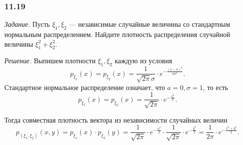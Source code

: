 \subsubsection*{11.19}

\textit{Задание.} Пусть $ \xi_1, \xi_2$ --- независимые случайные величины со стандартным нормальным распределением.
Найдите плотность распределения случайной величины $ \xi_1^2 + \xi_2^2$.

\textit{Решение.} Выпишем плотности $ \xi_1, \xi_2$ каждую из условия
$$p_{ \xi_1} \left( x \right) =
p_{ \xi_2} \left( x \right) =
\frac{1}{ \sqrt{2 \pi} \sigma} \cdot e^{- \frac{ \left( x - a \right)^2}{2 \sigma^2}}.$$
Стандартное нормальное распределение означает, что $a = 0, \sigma = 1$, то есть
$$p_{ \xi_1} \left( x \right) =
p_{ \xi_2} \left( x \right) =
\frac{1}{ \sqrt{2 \pi}} \cdot e^{- \frac{x^2}{2}}.$$

Тогда совместная плотность вектора из независимости случайных величин
$$p_{ \left( \xi_1, \xi_2 \right) } \left( x, y \right) =
p_{ \xi_1} \left( x \right) \cdot p_{ \xi_2} \left( y \right) =
\frac{1}{ \sqrt{2 \pi }} \cdot e^{- \frac{x^2}{2}} \cdot \frac{1}{ \sqrt{2 \pi }} \cdot e^{- \frac{y^2}{2}} =
\frac{1}{2 \pi } \cdot e^{- \frac{x^2 + y^2}{2}}.$$

